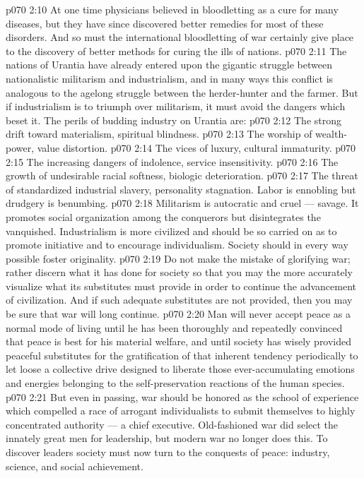 \vs p070 2:10 At one time physicians believed in bloodletting as a cure for many diseases, but they have since discovered better remedies for most of these disorders. And so must the international bloodletting of war certainly give place to the discovery of better methods for curing the ills of nations.
\vs p070 2:11 The nations of Urantia have already entered upon the gigantic struggle between nationalistic militarism and industrialism, and in many ways this conflict is analogous to the agelong struggle between the herder\hyp{}hunter and the farmer. But if industrialism is to triumph over militarism, it must avoid the dangers which beset it. The perils of budding industry on Urantia are:
\vs p070 2:12 \bibnobreakspace The strong drift toward materialism, spiritual blindness.
\vs p070 2:13 \bibnobreakspace The worship of wealth\hyp{}power, value distortion.
\vs p070 2:14 \bibnobreakspace The vices of luxury, cultural immaturity.
\vs p070 2:15 \bibnobreakspace The increasing dangers of indolence, service insensitivity.
\vs p070 2:16 \bibnobreakspace The growth of undesirable racial softness, biologic deterioration.
\vs p070 2:17 \bibnobreakspace The threat of standardized industrial slavery, personality stagnation. Labor is ennobling but drudgery is benumbing.
\vs p070 2:18 \pc Militarism is autocratic and cruel --- savage. It promotes social organization among the conquerors but disintegrates the vanquished. Industrialism is more civilized and should be so carried on as to promote initiative and to encourage individualism. Society should in every way possible foster originality.
\vs p070 2:19 Do not make the mistake of glorifying war; rather discern what it has done for society so that you may the more accurately visualize what its substitutes must provide in order to continue the advancement of civilization. And if such adequate substitutes are not provided, then you may be sure that war will long continue.
\vs p070 2:20 Man will never accept peace as a normal mode of living until he has been thoroughly and repeatedly convinced that peace is best for his material welfare, and until society has wisely provided peaceful substitutes for the gratification of that inherent tendency periodically to let loose a collective drive designed to liberate those ever\hyp{}accumulating emotions and energies belonging to the self\hyp{}preservation reactions of the human species.
\vs p070 2:21 But even in passing, war should be honored as the school of experience which compelled a race of arrogant individualists to submit themselves to highly concentrated authority --- a chief executive. Old\hyp{}fashioned war did select the innately great men for leadership, but modern war no longer does this. To discover leaders society must now turn to the conquests of peace: industry, science, and social achievement.
